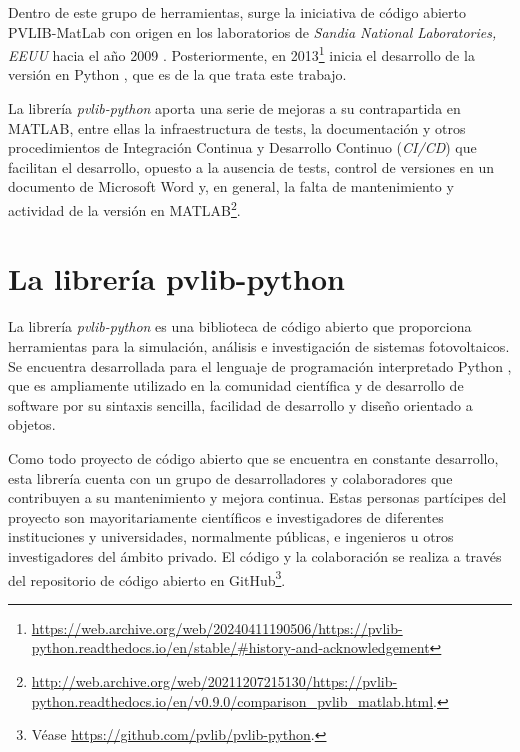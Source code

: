 Dentro de este grupo de herramientas, surge la iniciativa de código abierto PVLIB-MatLab con origen en los laboratorios de \textit{Sandia National Laboratories, EEUU} hacia el año 2009 \cite{Stein_Holmgren_Forbess_Hansen_2016}. Posteriormente, en 2013\footnote{\url{https://web.archive.org/web/20240411190506/https://pvlib-python.readthedocs.io/en/stable/\#history-and-acknowledgement}} inicia el desarrollo de la versión en Python \cite{Anderson_Hansen_Holmgren_Jensen_Mikofski_Driesse_2023, Stein_2012, Andrews_Stein_Hansen_Riley_2014, Holmgren_Andrews_Lorenzo_Stein_2015, Holmgren_Groenendyk_2016}, que es de la que trata este trabajo.

La librería \textit{pvlib-python} aporta una serie de mejoras a su contrapartida en MATLAB, entre ellas la infraestructura de tests, la documentación y otros procedimientos de Integración Continua y Desarrollo Continuo (\textit{CI/CD}) que facilitan el desarrollo, opuesto a la ausencia de tests, control de versiones en un documento de Microsoft Word y, en general, la falta de mantenimiento y actividad de la versión en MATLAB\footnote{\url{http://web.archive.org/web/20211207215130/https://pvlib-python.readthedocs.io/en/v0.9.0/comparison_pvlib_matlab.html}.}.

\section{La librería pvlib-python} \label{sct:pvlib}

La librería \textit{pvlib-python} es una biblioteca de código abierto que proporciona herramientas para la simulación, análisis e investigación de sistemas fotovoltaicos. Se encuentra desarrollada para el lenguaje de programación interpretado Python \cite{CS-R9526}, que es ampliamente utilizado en la comunidad científica y de desarrollo de software por su sintaxis sencilla, facilidad de desarrollo y diseño orientado a objetos.

Como todo proyecto de código abierto que se encuentra en constante desarrollo, esta librería cuenta con un grupo de desarrolladores y colaboradores que contribuyen a su mantenimiento y mejora continua. Estas personas partícipes del proyecto son mayoritariamente científicos e investigadores de diferentes instituciones y universidades, normalmente públicas, e ingenieros u otros investigadores del ámbito privado. El código y la colaboración se realiza a través del repositorio de código abierto en GitHub\footnote{Véase \url{https://github.com/pvlib/pvlib-python}.}.

